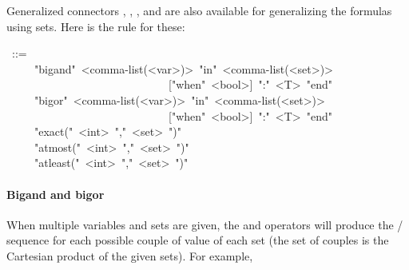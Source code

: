 \noindent Generalized connectors , , ,  and
 are also available for generalizing the formulas using sets. Here
is the rule for these:%
\begin{mdpre}%
~::=\\
~~~~\textbar{}~"bigand"~{\textless{}comma-list(\textless{}var\textgreater{})\textgreater{}}~"in"~{\textless{}comma-list(\textless{}set\textgreater{})\textgreater{}}\\
~~~~~~~~~~~~~~~~~~~~~~~~~~~~~{}["when"~{\textless{}bool\textgreater{}}]~":"~{\textless{}T\textgreater{}}~"end"\\
~~~~\textbar{}~"bigor"~{\textless{}comma-list(\textless{}var\textgreater{})\textgreater{}}~"in"~{\textless{}comma-list(\textless{}set\textgreater{})\textgreater{}}\\
~~~~~~~~~~~~~~~~~~~~~~~~~~~~~{}["when"~{\textless{}bool\textgreater{}}]~":"~{\textless{}T\textgreater{}}~"end"\\
~~~~\textbar{}~"exact("~{\textless{}int\textgreater{}}~","~{\textless{}set\textgreater{}}~")"\\
~~~~\textbar{}~"atmost("~{\textless{}int\textgreater{}}~","~{\textless{}set\textgreater{}}~")"\\
~~~~\textbar{}~"atleast("~{\textless{}int\textgreater{}}~","~{\textless{}set\textgreater{}}~")"%
\end{mdpre}

\paragraph{Bigand and bigor}\label{sec-bigand-and-bigor}%

\noindent When multiple variables and sets are given, the  and 
operators will produce the / sequence for each possible couple of
value of each set (the set of couples is the Cartesian product of the given
sets). For example,%

